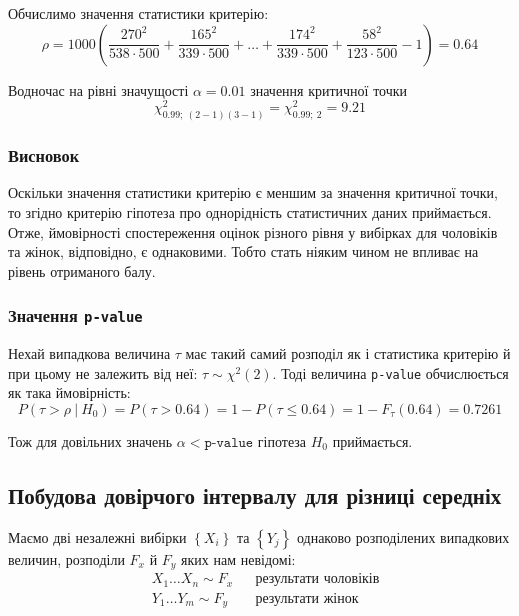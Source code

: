 Обчислимо значення статистики критерію:
\begin{equation*}
    \rho = 1000\left( \frac{270^2}{538\cdot 500}+\frac{165^2}{339\cdot 500} + \ldots + 
    \frac{174^2}{339\cdot 500}+\frac{58^2}{123\cdot 500} - 1 \right) = 0.64
\end{equation*}

Водночас на рівні значущості $\alpha=0.01$ значення критичної точки
\begin{equation*} 
    \chi^2_{0.99;\ (2-1)(3-1)}=\chi^2_{0.99;\ 2}=9.21
\end{equation*}

\subsubsection*{Висновок}

Оскільки значення статистики критерію є меншим за значення критичної точки, то згідно критерію гіпотеза 
про однорідність статистичних даних приймається. Отже, ймовірності спостереження оцінок різного рівня у 
вибірках для чоловіків та жінок, відповідно, є однаковими. Тобто стать ніяким чином не впливає на рівень 
отриманого балу.

\subsubsection*{Значення \texttt{p-value}}

Нехай випадкова величина $\tau$ має такий самий розподіл як і статистика критерію й при цьому не залежить 
від неї: $\tau\sim\chi^2(2)$. Тоді величина \texttt{p-value} обчислюється як така ймовірність:
\[ P(\tau>\rho\ |\ H_0)=P(\tau>0.64)=1-P(\tau\leqslant0.64)=1-F_{\tau}(0.64)=0.7261 \]

Тож для довільних значень $\alpha<\texttt{p-value}$ гіпотеза $H_0$ приймається.

\subsection*{Побудова довірчого інтервалу для різниці середніх}

Маємо дві незалежні вибірки $\left\{ X_i \right\}$ та $\left\{ Y_j \right\}$ 
однаково розподілених випадкових величин, розподіли $F_x$ й $F_y$ яких нам невідомі:
\begin{align*}
    &X_1 \ldots X_n\sim F_x && \text{результати чоловіків} \\
    &Y_1 \ldots Y_m\sim F_y && \text{результати жінок}
\end{align*}


